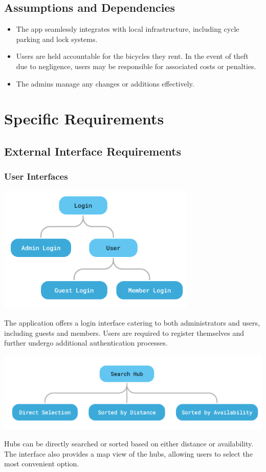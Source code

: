 \documentclass[11pt]{article}
\begin{document}
\subsection{Assumptions and Dependencies}
\begin{itemize}
    \item The app seamlessly integrates with local infrastructure, including cycle parking and lock systems.
    \item Users are held accountable for the bicycles they rent. In the event of theft due to negligence, users may be responsible for associated costs or penalties.
    \item The admins manage any changes or additions effectively.

\end{itemize}

\newpage
\section{Specific Requirements}
\subsection{External Interface Requirements}
\subsubsection{User Interfaces}

\begin{center}
    \includegraphics*{login-interface.png}
\end{center}
The application offers a login interface catering to both administrators and users, including guests and members. Users are required to register themselves and further undergo additional authentication processes.

\begin{center}
    \includegraphics*{search-interface.png}
\end{center}
Hubs can be directly searched or sorted based on either distance or availability. The interface also provides a map view of the hubs, allowing users to select the most convenient option.
\end{document}
